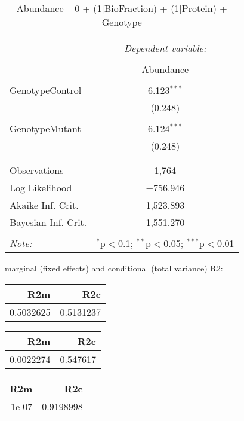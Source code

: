 \documentclass[11pt]{report}
\begin{document}
\begin{table}[!htbp] \centering 
  \caption{Abundance ~ 0 + (1|BioFraction) + (1|Protein) + Genotype} 
  \label{} 
\begin{tabular}{@{\extracolsep{5pt}}lc} 
\\[-1.8ex]\hline 
\hline \\[-1.8ex] 
 & \multicolumn{1}{c}{\textit{Dependent variable:}} \\ 
\cline{2-2} 
\\[-1.8ex] & Abundance \\ 
\hline \\[-1.8ex] 
 GenotypeControl & 6.123$^{***}$ \\ 
  & (0.248) \\ 
  & \\ 
 GenotypeMutant & 6.124$^{***}$ \\ 
  & (0.248) \\ 
  & \\ 
\hline \\[-1.8ex] 
Observations & 1,764 \\ 
Log Likelihood & $-$756.946 \\ 
Akaike Inf. Crit. & 1,523.893 \\ 
Bayesian Inf. Crit. & 1,551.270 \\ 
\hline 
\hline \\[-1.8ex] 
\textit{Note:}  & \multicolumn{1}{r}{$^{*}$p$<$0.1; $^{**}$p$<$0.05; $^{***}$p$<$0.01} \\ 
\end{tabular} 
\end{table} 
marginal (fixed effects) and conditional (total variance) R2:

\begin{tabular}{r|r}
\hline
R2m & R2c\\
\hline
0.5032625 & 0.5131237\\
\hline
\end{tabular}

\begin{tabular}{r|r}
\hline
R2m & R2c\\
\hline
0.0022274 & 0.547617\\
\hline
\end{tabular}

\begin{tabular}{r|r}
\hline
R2m & R2c\\
\hline
1e-07 & 0.9198998\\
\hline
\end{tabular}
\end{document}
